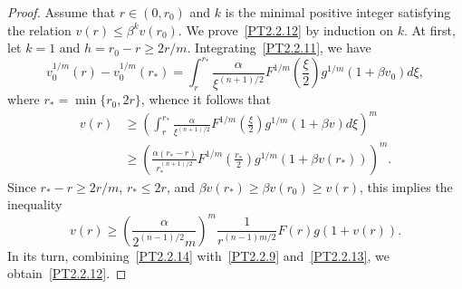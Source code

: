 \documentclass[10pt,a4paper]{amsart}
\begin{document}
\begin{proof}
Assume that $r \in (0, r_0)$ and $k$ is the minimal positive integer satisfying the relation $v (r) \le \beta^k v (r_0)$. 
We prove~\eqref{PT2.2.12} by induction on $k$.
At first, let $k = 1$ and $h = r_0 - r \ge 2 r / m$.
Integrating~\eqref{PT2.2.11}, we have
$$
	v_0^{1 / m} (r) - v_0^{1 / m} (r_*)
	=
	\int_r^{r_*}
	\frac{
		\alpha
	}{
		\xi^{(n + 1) / 2}
	}
	F^{1 / m} 
	\left(
		\frac{\xi}{2}
	\right)
	g^{1 / m} (1 + \beta v_0)
	d\xi,
$$
where $r_* = \min \{r_0, 2 r \}$,
whence it follows that
\begin{align*}
	v (r)
	&
	{}
	\ge
	\left(
		\int_r^{r_*}
		\frac{
			\alpha
		}{
			\xi^{(n + 1) / 2}
		}
		F^{1 / m} 
		\left(
			\frac{\xi}{2}
		\right)
		g^{1 / m} (1 + \beta v)
		d\xi
	\right)^m
	\\
	&
	{}
	\ge
	\left(
		\frac{
			\alpha 
			(r_* - r)
		}{
			r_*^{(n + 1) / 2}
		}
		F^{1 / m} 
		\left(
			\frac{r_*}{2}
		\right)
		g^{1 / m} (1 + \beta v (r_*))
	\right)^m.	
\end{align*}
Since $r_* - r \ge 2 r / m$, $r_* \le  2 r$, and $\beta v (r_*) \ge \beta v (r_0) \ge v (r)$, this implies the inequality
\begin{equation}
	v (r)
	\ge
	\left(
		\frac{
			\alpha
		}{
			2^{(n - 1) / 2}
			m
		}
	\right)^m
	\frac{
		1
	}{
		r^{(n - 1) m / 2}
	}
	F (r)
	g (1 + v (r)).
	\label{PT2.2.14}
\end{equation}
In its turn, combining~\eqref{PT2.2.14} with~\eqref{PT2.2.9} and~\eqref{PT2.2.13}, we obtain~\eqref{PT2.2.12}.


\end{proof}
\end{document}
